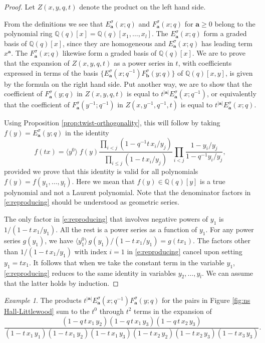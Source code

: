 \documentclass[12pt]{amsart}
\theoremstyle{definition}
\theoremstyle{remark}
\newtheorem{example}[thm]{Example}
\newcommand{\QQ}{{\mathbb Q}}
\newcommand{\aA}{{\mathbf a}}
\newcommand{\bb}{{\mathbf b}}
\begin{document}
\begin{proof}
Let $Z(x,y,q,t)$ denote the product on the left hand side.

From the definitions we see that $E^{\sigma }_{\aA }(x;q)$ and
$F^{\sigma }_{\aA }(x;q)$ for $\aA \geq 0$ 
belong to the polynomial
ring $\QQ (q)[x] = \QQ (q)[x_{1},\ldots,x_{l}]$.  The $E^{\sigma
}_{\aA }(x;q)$ form a graded basis of $\QQ (q)[x]$, since they are
homogeneous and $E^{\sigma }_{\aA }(x;q)$ has leading term $x^{\aA }$.
The $F^{\sigma }_{\aA }(x;q)$ likewise form a graded basis of $\QQ
(q)[x]$.  We are to prove that the expansion of $Z(x,y,q,t)$ as a
power series in $t$, with coefficients expressed in terms of the basis
$\{E^{\sigma }_{\aA }(x;q^{-1}) F^{\sigma }_{\bb }(y;q) \}$ of $\QQ
(q)[x,y]$, is given by the formula on the right hand side.  Put
another way, we are to show that the coefficient of $F^{\sigma }_{\aA
}(y;q)$ in $Z(x,y,q,t)$ is equal to $t^{|\aA |}E^{\sigma }_{\aA
}(x;q^{-1})$, or equivalently that the coefficient of $F^{\sigma
}_{\aA }(y^{-1};q^{-1})$ in $Z(x,y^{-1},q^{-1},t)$ is equal to
$t^{|\aA |}E^{\sigma }_{\aA }(x;q)$.

Using Proposition \ref{prop:twist-orthogonality}, this will follow by taking
$f(y) = E^{\sigma }_{\aA }(y;q)$ in the identity
\begin{equation}\label{e:reproducing}
f(t x) = \langle y^{0} \rangle\; f(y) \frac{\prod _{i<j}(1 - q^{-1}
t\, x_{i}/y_{j})}{\prod _{i\leq j} (1 - t\, x_{i}/y_{j} )} \prod
_{i<j} \frac{1 - y_{i}/y_{j}}{1 - q^{-1} y_{i}/y_{j}},
\end{equation}
provided we prove that this identity is valid for all polynomials
$f(y) = f(y_{1},\ldots,y_{l})$.  Here we mean that $f(y)\in \QQ
(q)[y]$ is a true polynomial and not a Laurent polynomial.  Note that
the denominator factors in \eqref{e:reproducing} should be understood
as geometric series.

The only factor in \eqref{e:reproducing} that involves negative powers
of $y_{1}$ is $1/(1-t\, x_{1}/y_{1})$.  All the rest is a power series
as a function of $y_{1}$.  For any power series $g(y_{1})$, we have
$\langle y_{1}^{0} \rangle\, g(y_{1})/(1-t\, x_{1}/y_{1}) = g(t
x_{1})$.  The factors other than $1/(1- t\, x_{1}/y_{1})$ with index
$i=1$ in \eqref{e:reproducing} cancel upon setting $y_{1} = tx_{1}$.
It follows that when we take the constant term in the variable
$y_{1}$, \eqref{e:reproducing} reduces to the same identity in
variables $y_{2},\ldots,y_{l}$.  We can assume that the latter holds
by induction.
\end{proof}
\begin{example}
The products $t^{|\aA|}E^{\sigma}_{\aA}(x;q^{-1}) F^{\sigma }_{\aA}(y;q)$ 
for the pairs in Figure \ref{fig:ns Hall-Littlewood}
sum to the $t^{0}$ through $t^{2}$ terms in the expansion of
\begin{equation}
\frac{(1 - q\, t\, x_{1} \, y_{2})(1 - q\, t\, x_{1} \,
y_{3})(1 - q\, t\, x_{2} \, y_{3})} {(1 - t\, x_{1}\, y_{1})(1 - t\,
x_{1}\, y_{2})(1 - t\, x_{1}\, y_{3})(1 - t\, x_{2}\, y_{2})(1 - t\,
x_{2}\, y_{3})(1 - t\, x_{3}\, y_{3})}.
\end{equation}
\end{example}
\end{document}
